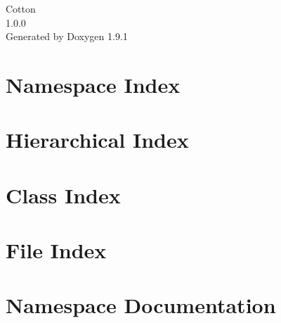 \let\mypdfximage\pdfximage\def\pdfximage{\immediate\mypdfximage}\documentclass[twoside]{book}
\newcommand{\+}{\discretionary{\mbox{\scriptsize$\hookleftarrow$}}{}{}}
\newcommand{\clearemptydoublepage}{%
  \newpage{\pagestyle{empty}\cleardoublepage}%
}
\begin{document}
\raggedbottom

\hypersetup{pageanchor=false,
             bookmarksnumbered=true,
             pdfencoding=unicode
            }
\begin{titlepage}
\vspace*{7cm}
\begin{center}%
{\Large Cotton \\[1ex]\large 1.\+0.\+0 }\\
\vspace*{1cm}
{\large Generated by Doxygen 1.9.1}\\
\end{center}
\end{titlepage}
\clearemptydoublepage
{}
\tableofcontents
\clearemptydoublepage
{}
\hypersetup{pageanchor=true}

\chapter{Namespace Index}

\chapter{Hierarchical Index}

\chapter{Class Index}

\chapter{File Index}

\chapter{Namespace Documentation}




\end{document}
